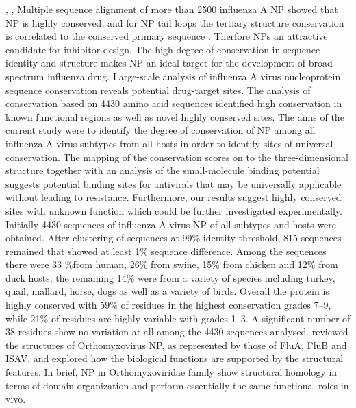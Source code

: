 \citep{1517}, \citep{1513}, \citep{1578}
Multiple sequence alignment of more than 2500 influenza A NP showed that NP is highly conserved, and for NP tail loops the tertiary structure conservation is correlated to the conserved primary sequence \citep{1517}. Therfore NPs an attractive candidate for inhibitor design. The high degree of conservation in sequence identity and structure makes NP an ideal target for the development of broad spectrum influenza drug.
\citep{1513} Large-scale analysis of influenza A virus nucleoprotein sequence conservation reveals potential drug-target sites. The analysis of conservation based on 4430 amino acid sequences identified high conservation in known functional regions as well as novel highly conserved sites. The aims of the current study were to identify the degree of conservation of NP among all influenza A virus subtypes from all hosts in order to identify sites of universal conservation. The mapping of the conservation scores on to the three-dimensional structure together with an analysis of the small-molecule binding potential suggests potential binding sites for antivirals that may be universally applicable without leading to resistance. Furthermore, our results suggest highly conserved sites with unknown function which could be further investigated experimentally. Initially 4430 sequences of influenza A virus NP of all subtypes and hosts were obtained. After clustering of sequences at 99\% identity threshold, 815 sequences remained that showed at least 1\% sequence difference. Among the sequences there were 33 \%from human, 26\% from swine, 15\% from chicken and 12\% from duck hosts; the remaining 14\% were from a variety of species including turkey, quail, mallard, horse, dogs as well as a variety of birds. Overall the protein is highly conserved with 59\% of residues in the highest conservation grades 7–9, while 21\% of residues are highly variable with grades 1–3. A significant number of 38 residues show no variation at all among the 4430 sequences analysed.
\citep{1578} reviewed the structures of Orthomyxovirus NP, as represented by those of FluA, FluB and ISAV, and explored how the biological functions are supported by the structural features. In brief, NP in Orthomyxoviridae family show structural homology in terms of domain organization and perform essentially the same functional roles in vivo.%

